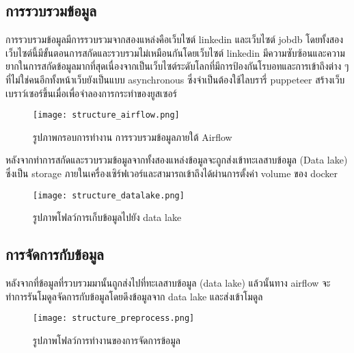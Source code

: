 \subsection{การรวบรวมข้อมูล}
การรวบรวมข้อมูลมีการรวบรวมจากสองแหล่งคือเว็บไซต์ linkedin และเว็บไซต์ jobdb โดยทั้งสองเว็บไซต์นี้มีขั้นตอนการสกัดและรวบรวมไม่เหมือนกันโดยเว็บไซต์ linkedin มีความซับซ้อนและความยากในการสกัดข้อมูลมากที่สุดเนื่องจากเป็นเว็บไซต์ระดับโลกที่มีการป้องกันโรบอทและการเข้าถึงต่าง ๆ 
ที่ไม่ใช่คนอีกทั้งหน้าเว็บยังเป็นแบบ asynchronous ซึ่งจำเป็นต้องใช้ไลบรารี่ puppeteer สร้างเว็บเบราว์เซอร์ขึ้นเมื่อเพื่อจำลองการกระทำของยูสเซอร์
\newline
\begin{figure}[!h]
  \centering
  \texttt{[image: structure\_airflow.png]}  
  \caption{รูปภาพกรอบการทำงาน การรวบรวมข้อมูลภายใต้ Airflow}
  \label{Fig:data-collection}
\end{figure}
หลังจากทำการสกัดและรวบรวมข้อมูลจากทั้งสองแหล่งข้อมูลจะถูกส่งเข้าทะเลสาบข้อมูล (Data lake) ซึ่งเป็น storage ภายในเครื่องเซิร์ฟเวอร์และสามารถเข้าถึงได้ผ่านการตั้งค่า volume ของ docker
\begin{figure}[!h]
  \centering
  \texttt{[image: structure\_datalake.png]}  
  \caption{รูปภาพโฟลว์การเก็บข้อมูลไปยัง data lake}
  \label{Fig:data-collection}
\end{figure}
\subsection{การจัดการกับข้อมูล}
หลังจากที่ข้อมูลที่รวบรวมมานั้นถูกส่งไปที่ทะเลสาบข้อมูล (data lake) แล้วนั้นทาง airflow จะทำการรันโมดูลจัดการกับข้อมูลโดยดึงข้อมูลจาก data lake และส่งเข้าโมดูล
\begin{figure}[!h]
  \centering
  \texttt{[image: structure\_preprocess.png]}  
  \caption{รูปภาพโฟลว์การทำงานของการจัดการข้อมูล}
  \label{Fig:data-collection}
\end{figure}

